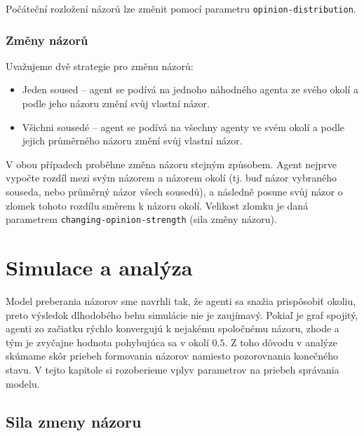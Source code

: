 \documentclass[10pt,a4paper]{report}
\begin{document}
Počáteční rozložení názorů lze změnit pomocí parametru \texttt{opinion-distribution}. 

\subsection{Změny názorů}
Uvažujeme dvě strategie pro změnu názorů:

\begin{itemize}
	\item Jeden soused -- agent se podívá na jednoho náhodného agenta ze svého okolí a podle jeho názoru změní svůj vlastní názor.
	\item Všichni sousedé -- agent se podívá na všechny agenty ve svém okolí a podle jejich průměrného názoru změní svůj vlastní názor.
\end{itemize}

V obou případech proběhne změna názoru stejným způsobem. Agent nejprve vypočte rozdíl mezi svým názorem a názorem okolí (tj. buď názor vybraného souseda, nebo průměrný názor všech sousedů), a následně posune svůj názor o zlomek tohoto rozdílu směrem k názoru okolí. Velikost zlomku je daná parametrem \texttt{changing-opinion-strength} (sila změny názoru).












\chapter{Simulace a analýza}
Model preberania názorov sme navrhli tak, že agenti sa snažia prispôsobiť okoliu, preto výsledok dlhodobého behu simulácie nie je zaujímavý. Pokiaľ je graf spojitý, agenti zo začiatku rýchlo konvergujú k nejakému spoločnému názoru, zhode a tým je zvyčajne hodnota pohybujúca sa v okolí $0.5$. Z toho dôvodu v analýze skúmame skôr priebeh formovania názorov namiesto pozorovnania konečného stavu. V tejto kapitole si rozoberieme vplyv parametrov na priebeh správania modelu.

\section{Sila zmeny názoru}
\end{document}
